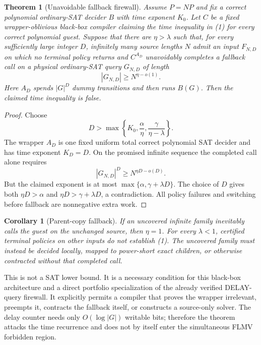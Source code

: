 \documentclass[11pt]{article}
\newtheorem{theorem}{Theorem}
\newtheorem{corollary}{Corollary}
\begin{document}
\begin{theorem}[Unavoidable fallback firewall]
Assume $P=NP$ and fix a correct polynomial ordinary-SAT decider $B$ with time
exponent $K_0$.  Let $C$ be a fixed wrapper-oblivious black-box compiler claiming
the time inequality in (1) for every correct polynomial guest.  Suppose that
there are $\eta>\lambda$ such that, for every sufficiently large integer $D$,
infinitely many source lengths $N$ admit an input $F_{N,D}$ on which no terminal
policy returns and $C^{A_D}$ unavoidably completes a fallback call on a physical
ordinary-SAT query $G_{N,D}$ of length
\[
       |G_{N,D}|\ge N^{\eta-o(1)}.                                \tag{2}
\]
Here $A_D$ spends $|G|^D$ dummy transitions and then runs $B(G)$.  Then the
claimed time inequality is false.
\end{theorem}

\begin{proof}
Choose
\[
 D>\max\left\{K_0,\frac{\alpha}{\eta},
                    \frac{\gamma}{\eta-\lambda}\right\}.
\]
The wrapper $A_D$ is one fixed uniform total correct polynomial SAT decider and
has time exponent $K_D=D$.  On the promised infinite sequence the completed
call alone requires
\[
 |G_{N,D}|^D\ge N^{\eta D-o(D)}.
\]
But the claimed exponent is at most
$\max\{\alpha,\gamma+\lambda D\}$.  The choice of $D$ gives both
$\eta D>\alpha$ and $\eta D>\gamma+\lambda D$, a contradiction.
All policy failures and switching before fallback are nonnegative extra work.
\end{proof}

\begin{corollary}[Parent-copy fallback]
If an uncovered infinite family inevitably calls the guest on the unchanged
source, then $\eta=1$.  For every $\lambda<1$, certified terminal policies on
other inputs do not establish (1).  The uncovered family must instead be decided
locally, mapped to power-short exact children, or otherwise contracted without
that completed call.
\end{corollary}

This is not a SAT lower bound.  It is a necessary condition for this black-box
architecture and a direct portfolio specialization of the already verified
DELAY-query firewall.  It explicitly permits a compiler that proves the wrapper
irrelevant, preempts it, contracts the fallback itself, or constructs a
source-only solver.  The delay counter needs only $O(\log |G|)$ writable bits;
therefore the theorem attacks the time recurrence and does not by itself enter
the simultaneous FLMV forbidden region.
\end{document}
